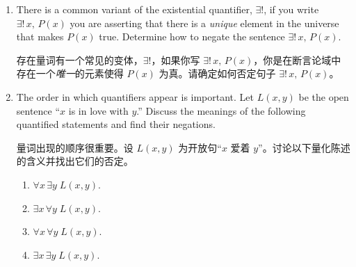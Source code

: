 \begin{enumerate}
    \item There is a common variant of the existential quantifier,
    $\exists !$, if you write $\exists ! \, x, \, P(x)$ you are asserting 
    that there is a \emph{unique} element 
    in the universe that makes $P(x)$ true.
    Determine how to negate the sentence $\exists ! \, x, \, P(x)$.
    
    存在量词有一个常见的变体，$\exists !$，如果你写 $\exists ! \, x, \, P(x)$，你是在断言论域中存在一个\emph{唯一}的元素使得 $P(x)$ 为真。请确定如何否定句子 $\exists ! \, x, \, P(x)$。
    \wbvfill
    
    
    \rule{0pt}{0pt}
    
    \wbvfill
    
    \item The order in which quantifiers appear is important.
    Let $L(x,y)$
    be the open sentence ``$x$ is in love with $y$.''  Discuss the meanings of the
    following quantified statements and find their negations.
    
    量词出现的顺序很重要。设 $L(x,y)$ 为开放句“$x$ 爱着 $y$”。讨论以下量化陈述的含义并找出它们的否定。
    \begin{enumerate}
    \item \wbitemsep $\forall x \, \exists y \; L(x,y)$.
    \item \wbitemsep $\exists x \, \forall y \; L(x, y)$.
    \item \wbitemsep $\forall x \, \forall y \; L(x, y)$.
    \item \wbitemsep $\exists x \, \exists y \; L(x, y)$.
    \end{enumerate}
    
\end{enumerate}
